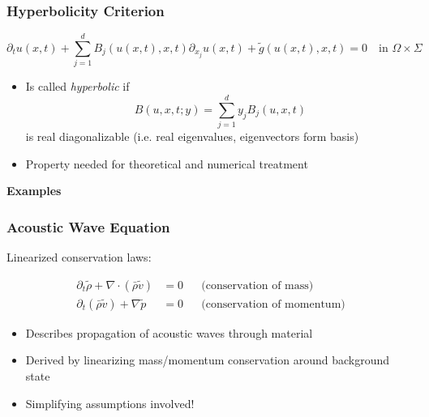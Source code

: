 \documentclass[ignorenonframetext,11pt]{beamer}
\theoremstyle{definition}
\begin{document}
\begin{frame}
\frametitle{Hyperbolicity Criterion}

\begin{equation*}
\partial_t u(x,t) + \sum_{j=1}^{d} B_j(u(x,t),x,t) \partial_{x_j} u(x,t) + \tilde{g}(u(x,t),x,t) = 0
\quad\text{in $\Omega\times\Sigma$}
\end{equation*}

\begin{itemize}
  \item Is called \textit{hyperbolic} if
        \begin{equation*}\label{eq:BMatrix}
          B(u,x,t; y) = \sum_{j=1}^{d} y_j B_j(u,x,t)
        \end{equation*}
        is real diagonalizable (i.e. real eigenvalues, eigenvectors form basis)
  \item Property needed for theoretical and numerical treatment
\end{itemize}
\end{frame}


\begin{frame}
\begin{center}
\Large\textbf{Examples}
\end{center}
\end{frame}

\begin{frame}
\frametitle{Acoustic Wave Equation}

Linearized conservation laws:

\begin{align*}
  \partial_t \tilde{\rho} +  \nabla\cdot(\bar{\rho} \tilde{v}) &= 0 &&\text{(conservation of mass)}\\
  \partial_t (\bar\rho \tilde{v}) + \nabla \tilde{p} &= 0 &&\text{(conservation of momentum)}
\end{align*}

\begin{itemize}
  \item Describes propagation of acoustic waves through material
  \item Derived by linearizing mass/momentum conservation around background state
  \item Simplifying assumptions involved!
\end{itemize}
\end{frame}
\end{document}
